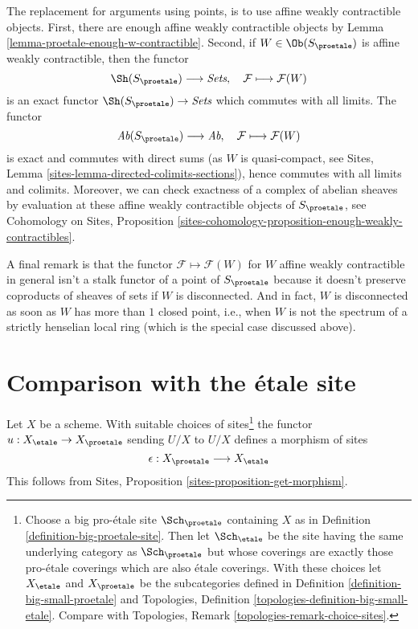 \medskip\noindent
The replacement for arguments using points, is to use affine
weakly contractible objects.
First, there are enough affine weakly contractible objects by
Lemma \ref{lemma-proetale-enough-w-contractible}.
Second, if $W \in \Ob(S_\proetale)$ is affine weakly contractible,
then the functor
$$
\Sh(S_\proetale) \longrightarrow \textit{Sets},\quad
\mathcal{F} \longmapsto \mathcal{F}(W)
$$
is an exact functor $\Sh(S_\proetale) \to \textit{Sets}$ which commutes
with all limits. The functor
$$
\textit{Ab}(S_\proetale) \longrightarrow \textit{Ab},\quad
\mathcal{F} \longmapsto \mathcal{F}(W)
$$
is exact and commutes with direct sums (as $W$ is quasi-compact, see
Sites, Lemma \ref{sites-lemma-directed-colimits-sections}), hence
commutes with all limits and colimits. Moreover, we can check exactness of
a complex of abelian sheaves by evaluation at these affine
weakly contractible objects of $S_\proetale$, see
Cohomology on Sites, Proposition
\ref{sites-cohomology-proposition-enough-weakly-contractibles}.

\medskip\noindent
A final remark is that the functor $\mathcal{F} \mapsto \mathcal{F}(W)$
for $W$ affine weakly contractible in general isn't a stalk functor of a
point of $S_\proetale$ because it doesn't preserve coproducts of sheaves of
sets if $W$ is disconnected. And in fact, $W$ is disconnected as soon as $W$
has more than $1$ closed point, i.e., when $W$ is not the spectrum of a
strictly henselian local ring (which is the special case discussed above).





\section{Comparison with the \'etale site}
\label{section-comparison}

\noindent
Let $X$ be a scheme. With suitable choices of sites\footnote{Choose
a big pro-\'etale site $\Sch_\proetale$ containing $X$ as in
Definition \ref{definition-big-proetale-site}. Then let $\Sch_\etale$
be the site having the same underlying category as $\Sch_\proetale$ but
whose coverings are exactly those pro-\'etale coverings which are also
\'etale coverings. With these choices let $X_\etale$ and $X_\proetale$
be the subcategories defined in
Definition \ref{definition-big-small-proetale} and
Topologies, Definition \ref{topologies-definition-big-small-etale}.
Compare with
Topologies, Remark \ref{topologies-remark-choice-sites}.}
the functor $u : X_\etale \to X_\proetale$ sending
$U/X$ to $U/X$ defines a morphism of sites
$$
\epsilon : X_\proetale \longrightarrow X_\etale
$$
This follows from Sites, Proposition \ref{sites-proposition-get-morphism}.

